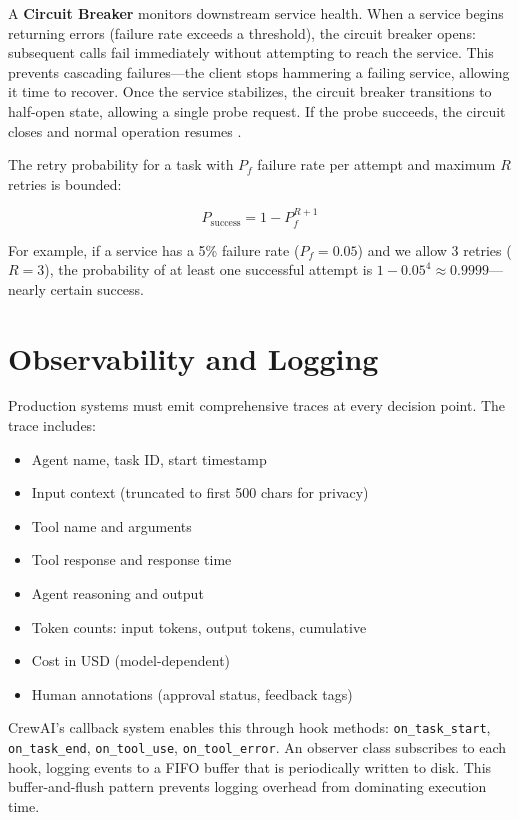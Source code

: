 A \textbf{Circuit Breaker} monitors downstream service health. When a service begins returning errors (failure rate exceeds a threshold), the circuit breaker opens: subsequent calls fail immediately without attempting to reach the service. This prevents cascading failures—the client stops hammering a failing service, allowing it time to recover. Once the service stabilizes, the circuit breaker transitions to half-open state, allowing a single probe request. If the probe succeeds, the circuit closes and normal operation resumes \cite{Segal2026}.

The retry probability for a task with $P_f$ failure rate per attempt and maximum $R$ retries is bounded:

\begin{equation}
P_{\text{success}} = 1 - P_f^{R+1}
\label{eq:retry_probability}
\end{equation}

For example, if a service has a 5\% failure rate ($P_f = 0.05$) and we allow 3 retries ($R = 3$), the probability of at least one successful attempt is $1 - 0.05^4 \approx 0.9999$—nearly certain success.

\section{Observability and Logging}

Production systems must emit comprehensive traces at every decision point. The trace includes:

\begin{itemize}
\item Agent name, task ID, start timestamp
\item Input context (truncated to first 500 chars for privacy)
\item Tool name and arguments
\item Tool response and response time
\item Agent reasoning and output
\item Token counts: input tokens, output tokens, cumulative
\item Cost in USD (model-dependent)
\item Human annotations (approval status, feedback tags)
\end{itemize}

CrewAI's callback system enables this through hook methods: \texttt{on\_task\_start}, \texttt{on\_task\_end}, \texttt{on\_tool\_use}, \texttt{on\_tool\_error}. An observer class subscribes to each hook, logging events to a FIFO buffer that is periodically written to disk. This buffer-and-flush pattern prevents logging overhead from dominating execution time.

